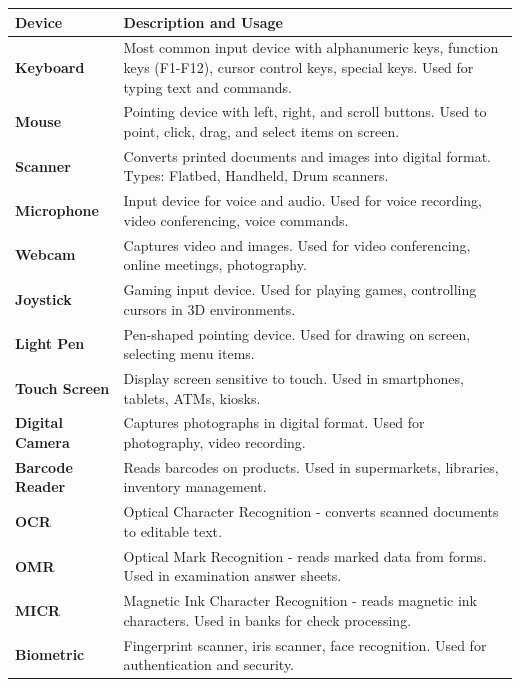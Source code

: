\documentclass[12pt,a4paper]{article}
\begin{document}
\begin{longtable}{|p{3cm}|p{10cm}|}
\hline
\textbf{Device} & \textbf{Description and Usage} \\
\hline
\endhead

\textbf{Keyboard} & Most common input device with alphanumeric keys, function keys (F1-F12), cursor control keys, special keys. Used for typing text and commands. \\
\hline

\textbf{Mouse} & Pointing device with left, right, and scroll buttons. Used to point, click, drag, and select items on screen. \\
\hline

\textbf{Scanner} & Converts printed documents and images into digital format. Types: Flatbed, Handheld, Drum scanners. \\
\hline

\textbf{Microphone} & Input device for voice and audio. Used for voice recording, video conferencing, voice commands. \\
\hline

\textbf{Webcam} & Captures video and images. Used for video conferencing, online meetings, photography. \\
\hline

\textbf{Joystick} & Gaming input device. Used for playing games, controlling cursors in 3D environments. \\
\hline

\textbf{Light Pen} & Pen-shaped pointing device. Used for drawing on screen, selecting menu items. \\
\hline

\textbf{Touch Screen} & Display screen sensitive to touch. Used in smartphones, tablets, ATMs, kiosks. \\
\hline

\textbf{Digital Camera} & Captures photographs in digital format. Used for photography, video recording. \\
\hline

\textbf{Barcode Reader} & Reads barcodes on products. Used in supermarkets, libraries, inventory management. \\
\hline

\textbf{OCR} & Optical Character Recognition - converts scanned documents to editable text. \\
\hline

\textbf{OMR} & Optical Mark Recognition - reads marked data from forms. Used in examination answer sheets. \\
\hline

\textbf{MICR} & Magnetic Ink Character Recognition - reads magnetic ink characters. Used in banks for check processing. \\
\hline

\textbf{Biometric} & Fingerprint scanner, iris scanner, face recognition. Used for authentication and security. \\
\hline

\end{longtable}
\end{document}
